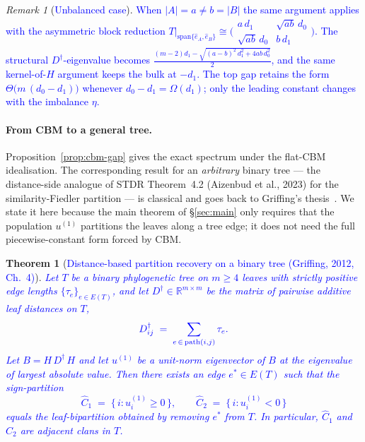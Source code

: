 \documentclass[11pt]{article}
\newcommand{\new}[1]{\textcolor{blue}{#1}}
\newcommand{\newmath}[1]{{\color{blue} #1}}
\newtheorem{theorem}{Theorem}[section]
\theoremstyle{remark}
\newtheorem*{remark}{Remark}
\newcommand{\R}{\mathbb{R}}
\newcommand{\1}{\mathbf{1}}
\newcommand{\Ddist}{D^{\dagger}}      %
\newcommand{\Bop}{B}
\newcommand{\Hop}{H}                  %
\begin{document}
\begin{remark}[\new{Unbalanced case}]
\new{When $|A| = a \ne b = |B|$ the same argument applies with the
asymmetric block reduction
$T|_{\mathrm{span}\{\hat e_{A},\hat e_{B}\}} \cong
\big(\begin{smallmatrix} a\,d_{1} & \sqrt{ab}\,d_{0} \\
\sqrt{ab}\,d_{0} & b\,d_{1}\end{smallmatrix}\big)$.
The structural $\Ddist$-eigenvalue becomes
$\frac{(m{-}2)d_{1} - \sqrt{(a{-}b)^{2}\,d_{1}^{2} + 4 a b\,d_{0}^{2}}}{2}$,
and the same kernel-of-$\Hop$ argument keeps the bulk at $-d_{1}$.
The top gap retains the form $\Theta\!\bigl(m\,(d_{0} - d_{1})\bigr)$
whenever $d_{0} - d_{1} = \Omega(d_{1})$; only the leading constant
changes with the imbalance $\eta$.}
\end{remark}

\paragraph{From CBM to a general tree.}
Proposition~\ref{prop:cbm-gap} gives the exact spectrum under the
flat-CBM idealisation. The corresponding result for an \emph{arbitrary}
binary tree --- the distance-side analogue of STDR Theorem~4.2
(Aizenbud et al., 2023) for the similarity-Fiedler partition --- is
classical and goes back to Griffing's thesis~\cite{Griffing2012}. We
state it here because the main theorem of \S\ref{sec:main} only requires
that the population $u^{(1)}$ partitions the leaves along a tree edge;
it does not need the full piecewise-constant form forced by CBM.

\begin{theorem}[\new{Distance-based partition recovery on a binary tree
  (Griffing, 2012, Ch.~4)}]
\label{thm:griffing}
\new{Let $T$ be a binary phylogenetic tree on $m \ge 4$ leaves with
strictly positive edge lengths $\{\tau_{e}\}_{e \in E(T)}$, and let
$\Ddist \in \R^{m\times m}$ be the matrix of pairwise additive leaf
distances on $T$,}
\begin{equation*}
\newmath{
  \Ddist_{ij} \;=\; \sum_{e \,\in\, \mathrm{path}(i,j)} \tau_{e}.
}
\end{equation*}
\new{Let $\Bop = \Hop\,\Ddist\,\Hop$ and let $u^{(1)}$ be a unit-norm
eigenvector of $\Bop$ at the eigenvalue of \emph{largest absolute value}.
Then there exists an edge $e^{*} \in E(T)$ such that the sign-partition
\begin{equation*}
  \widehat{C}_{1} \;=\; \{\, i : u^{(1)}_{i} \ge 0 \,\},
  \qquad
  \widehat{C}_{2} \;=\; \{\, i : u^{(1)}_{i} <   0 \,\}
\end{equation*}
equals the leaf-bipartition obtained by removing $e^{*}$ from $T$. In
particular, $\widehat{C}_{1}$ and $\widehat{C}_{2}$ are
\emph{adjacent clans in $T$}.}
\end{theorem}
\end{document}
